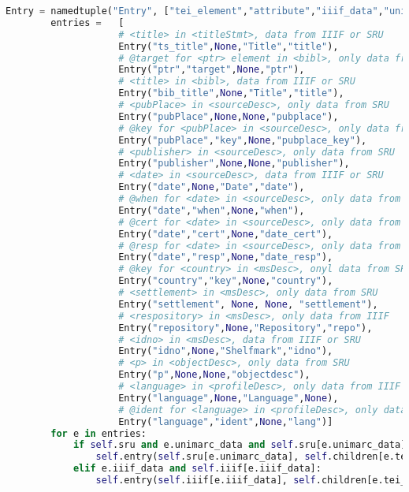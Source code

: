 \documentclass[class=article, crop=false]{standalone}
\begin{document}
\begin{lstlisting}[language=python, style=python]
        Entry = namedtuple("Entry", ["tei_element","attribute","iiif_data","unimarc_data"])
        entries =   [
                    # <title> in <titleStmt>, data from IIIF or SRU
                    Entry("ts_title",None,"Title","title"),
                    # @target for <ptr> element in <bibl>, only data from SRU
                    Entry("ptr","target",None,"ptr"),
                    # <title> in <bibl>, data from IIIF or SRU
                    Entry("bib_title",None,"Title","title"),
                    # <pubPlace> in <sourceDesc>, only data from SRU
                    Entry("pubPlace",None,None,"pubplace"),
                    # @key for <pubPlace> in <sourceDesc>, only data from SRU
                    Entry("pubPlace","key",None,"pubplace_key"),
                    # <publisher> in <sourceDesc>, only data from SRU
                    Entry("publisher",None,None,"publisher"),
                    # <date> in <sourceDesc>, data from IIIF or SRU
                    Entry("date",None,"Date","date"),
                    # @when for <date> in <sourceDesc>, only data from SRU
                    Entry("date","when",None,"when"),
                    # @cert for <date> in <sourceDesc>, only data from SRU
                    Entry("date","cert",None,"date_cert"),
                    # @resp for <date> in <sourceDesc>, only data from SRU
                    Entry("date","resp",None,"date_resp"),
                    # @key for <country> in <msDesc>, onyl data from SRU
                    Entry("country","key",None,"country"),
                    # <settlement> in <msDesc>, only data from SRU
                    Entry("settlement", None, None, "settlement"),
                    # <respository> in <msDesc>, only data from IIIF
                    Entry("repository",None,"Repository","repo"),
                    # <idno> in <msDesc>, data from IIIF or SRU
                    Entry("idno",None,"Shelfmark","idno"),
                    # <p> in <objectDesc>, only data from SRU
                    Entry("p",None,None,"objectdesc"),
                    # <language> in <profileDesc>, only data from IIIF
                    Entry("language",None,"Language",None),
                    # @ident for <language> in <profileDesc>, only data from SRU
                    Entry("language","ident",None,"lang")]
        for e in entries:
            if self.sru and e.unimarc_data and self.sru[e.unimarc_data]:
                self.entry(self.sru[e.unimarc_data], self.children[e.tei_element], e.attribute)
            elif e.iiif_data and self.iiif[e.iiif_data]:
                self.entry(self.iiif[e.iiif_data], self.children[e.tei_element], e.attribute)
    

\end{lstlisting}
\end{document}
